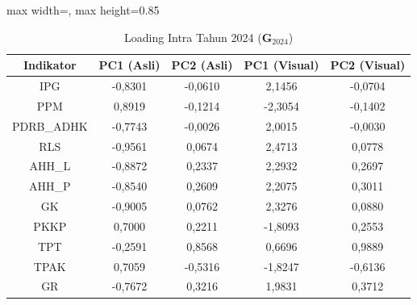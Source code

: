 \begin{table}[H]
\centering
\caption{Loading Intra Tahun 2024 ($\mathbf{G}_{2024}$)} \label{tab:app2loading_intra_2024}
\begin{adjustbox}{max width=\textwidth, max height=0.85\textheight}
\begin{tabular}{|c|c|c|c|c|}
\hline
\textbf{Indikator} & \textbf{PC1 (Asli)} & \textbf{PC2 (Asli)} & \textbf{PC1 (Visual)} & \textbf{PC2 (Visual)} \\
\hline
IPG & -0,8301 & -0,0610 & 2,1456 & -0,0704 \\
PPM & 0,8919 & -0,1214 & -2,3054 & -0,1402 \\
PDRB\_ADHK & -0,7743 & -0,0026 & 2,0015 & -0,0030 \\
RLS & -0,9561 & 0,0674 & 2,4713 & 0,0778 \\
AHH\_L & -0,8872 & 0,2337 & 2,2932 & 0,2697 \\
AHH\_P & -0,8540 & 0,2609 & 2,2075 & 0,3011 \\
GK & -0,9005 & 0,0762 & 2,3276 & 0,0880 \\
PKKP & 0,7000 & 0,2211 & -1,8093 & 0,2553 \\
TPT & -0,2591 & 0,8568 & 0,6696 & 0,9889 \\
TPAK & 0,7059 & -0,5316 & -1,8247 & -0,6136 \\
GR & -0,7672 & 0,3216 & 1,9831 & 0,3712 \\
\hline
\end{tabular}
\end{adjustbox}
\end{table}
